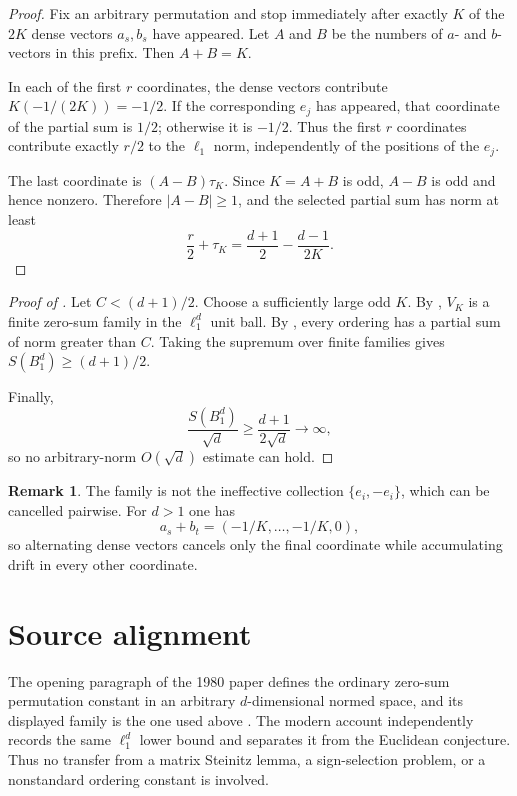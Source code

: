 \documentclass[10pt,reqno]{amsart}
\theoremstyle{definition}
\newtheorem{remark}[theorem]{Remark}
\begin{document}
\begin{proof}
Fix an arbitrary permutation and stop immediately after exactly $K$ of the $2K$ dense vectors $a_s,b_s$ have appeared. Let $A$ and $B$ be the numbers of $a$- and $b$-vectors in this prefix. Then $A+B=K$.

In each of the first $r$ coordinates, the dense vectors contribute $K(-1/(2K))=-1/2$. If the corresponding $e_j$ has appeared, that coordinate of the partial sum is $1/2$; otherwise it is $-1/2$. Thus the first $r$ coordinates contribute exactly $r/2$ to the $\ell_1$ norm, independently of the positions of the $e_j$.

The last coordinate is $(A-B)\tau_K$. Since $K=A+B$ is odd, $A-B$ is odd and hence nonzero. Therefore $|A-B|\geq1$, and the selected partial sum has norm at least
\[
  \frac r2+\tau_K
  =\frac{d+1}{2}-\frac{d-1}{2K}.
\]
\end{proof}

\begin{proof}[Proof of ]
Let $C<(d+1)/2$. Choose a sufficiently large odd $K$. By , $V_K$ is a finite zero-sum family in the $\ell_1^d$ unit ball. By , every ordering has a partial sum of norm greater than $C$. Taking the supremum over finite families gives $S(B_1^d)\geq(d+1)/2$.

Finally,
\[
  \frac{S(B_1^d)}{\sqrt d}
  \geq \frac{d+1}{2\sqrt d}\longrightarrow\infty,
\]
so no arbitrary-norm $O(\sqrt d)$ estimate can hold.
\end{proof}

\begin{remark}
The family is not the ineffective collection $\{e_i,-e_i\}$, which can be cancelled pairwise. For $d>1$ one has
\[
  a_s+b_t=(-1/K,\ldots,-1/K,0),
\]
so alternating dense vectors cancels only the final coordinate while accumulating drift in every other coordinate.
\end{remark}

\section{Source alignment}

The opening paragraph of the 1980 paper defines the ordinary zero-sum permutation constant in an arbitrary $d$-dimensional normed space, and its displayed family is the one used above \cite{GrinbergSevastyanov}. The modern account \cite{AmbrusHeck} independently records the same $\ell_1^d$ lower bound and separates it from the Euclidean conjecture. Thus no transfer from a matrix Steinitz lemma, a sign-selection problem, or a nonstandard ordering constant is involved.
\end{document}
